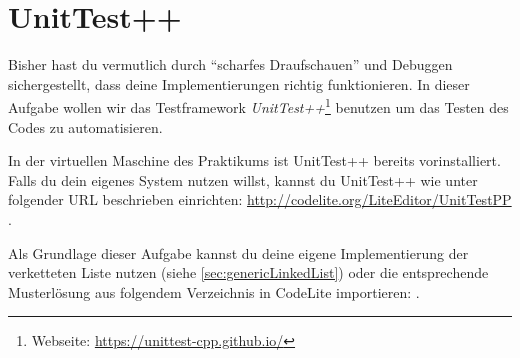 \section{\ExercisePrefixAdvanced UnitTest++ \optional}\label{sec:unit_test}
\optionaltextboxCPP
{}

Bisher hast du vermutlich durch \enquote{scharfes Draufschauen} und Debuggen sichergestellt, dass deine Implementierungen richtig funktionieren.
In dieser Aufgabe wollen wir das Testframework \emph{UnitTest++}\footnote{Webseite: \url{https://unittest-cpp.github.io/}} benutzen um das Testen des Codes zu automatisieren.

In der virtuellen Maschine des Praktikums ist UnitTest++ bereits vorinstalliert.
Falls du dein eigenes System nutzen willst, kannst du UnitTest++ wie unter folgender URL beschrieben einrichten: \url{http://codelite.org/LiteEditor/UnitTestPP } .

Als Grundlage dieser Aufgabe kannst du deine eigene Implementierung der verketteten Liste nutzen (siehe \ref{sec:genericLinkedList}) oder die entsprechende Musterlösung aus folgendem Verzeichnis in CodeLite importieren: .

